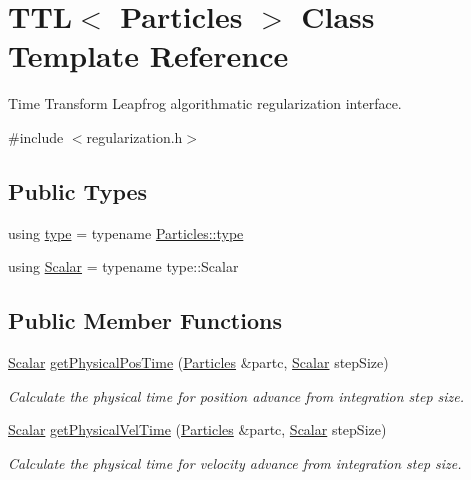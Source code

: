 \hypertarget{class_t_t_l}{}\section{T\+TL$<$ Particles $>$ Class Template Reference}
\label{class_t_t_l}


Time Transform Leapfrog algorithmatic regularization interface.  




{\ttfamily \#include $<$regularization.\+h$>$}

\subsection*{Public Types}
\begin{DoxyCompactItemize}
\item 
using \mbox{\hyperlink{class_t_t_l_af4afef1cacfe12873d9d97ca04d66d11}{type}} = typename \mbox{\hyperlink{class_vel_indep_particles_a0c62b43c2f0a50565e5e06587fddee18}{Particles\+::type}}
\item 
using \mbox{\hyperlink{class_t_t_l_a8d541e387362cebeb59841d22d78f2b4}{Scalar}} = typename type\+::\+Scalar
\end{DoxyCompactItemize}
\subsection*{Public Member Functions}
\begin{DoxyCompactItemize}
\item 
\mbox{\hyperlink{class_t_t_l_a8d541e387362cebeb59841d22d78f2b4}{Scalar}} \mbox{\hyperlink{class_t_t_l_a0b0f528b376e0ddffef5e7847562ac37}{get\+Physical\+Pos\+Time}} (\mbox{\hyperlink{struct_particles}{Particles}} \&partc, \mbox{\hyperlink{class_t_t_l_a8d541e387362cebeb59841d22d78f2b4}{Scalar}} step\+Size)
\begin{DoxyCompactList}\small\item\em Calculate the physical time for position advance from integration step size. \end{DoxyCompactList}\item 
\mbox{\hyperlink{class_t_t_l_a8d541e387362cebeb59841d22d78f2b4}{Scalar}} \mbox{\hyperlink{class_t_t_l_a84a267b2836e5bf4f98a04bed6b6dccb}{get\+Physical\+Vel\+Time}} (\mbox{\hyperlink{struct_particles}{Particles}} \&partc, \mbox{\hyperlink{class_t_t_l_a8d541e387362cebeb59841d22d78f2b4}{Scalar}} step\+Size)
\begin{DoxyCompactList}\small\item\em Calculate the physical time for velocity advance from integration step size. \end{DoxyCompactList}\end{DoxyCompactItemize}


